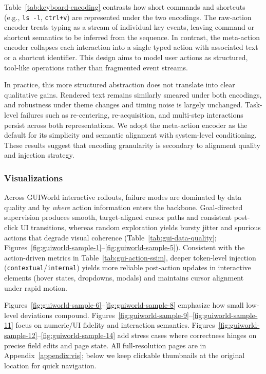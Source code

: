 Table~\ref{tab:keyboard-encoding} contrasts how short commands and shortcuts (e.g., \texttt{ls -l}, \texttt{ctrl+v}) are represented under the two encodings.
The raw-action encoder treats typing as a stream of individual key events, leaving command or shortcut semantics to be inferred from the sequence.
In contrast, the meta-action encoder collapses each interaction into a single typed action with associated text or a shortcut identifier.
This design aims to model user actions as structured, tool-like operations rather than fragmented event streams.

In practice, this more structured abstraction does not translate into clear qualitative gains.
Rendered text remains similarly smeared under both encodings, and robustness under theme changes and timing noise is largely unchanged.
Task-level failures such as re-centering, re-acquisition, and multi-step interactions persist across both representations.
We adopt the meta-action encoder as the default for its simplicity and semantic alignment with system-level conditioning.
These results suggest that encoding granularity is secondary to alignment quality and injection strategy.

\subsubsection{Visualizations}

Across GUIWorld interactive rollouts, failure modes are dominated by data quality and by \emph{where} action information enters the backbone.
Goal-directed supervision produces smooth, target-aligned cursor paths and consistent post-click UI transitions, whereas random exploration yields bursty jitter and spurious actions that degrade visual coherence (Table~\ref{tab:gui-data-quality}; Figures~\ref{fig:guiworld-sample-1}--\ref{fig:guiworld-sample-5}).
Consistent with the action-driven metrics in Table~\ref{tab:gui-action-ssim}, deeper token-level injection (\texttt{contextual}/\texttt{internal}) yields more reliable post-action updates in interactive elements (hover states, dropdowns, modals) and maintains cursor alignment under rapid motion.

Figures~\ref{fig:guiworld-sample-6}--\ref{fig:guiworld-sample-8} emphasize how small low-level deviations compound.
Figures~\ref{fig:guiworld-sample-9}--\ref{fig:guiworld-sample-11} focus on numeric/UI fidelity and interaction semantics.
Figures~\ref{fig:guiworld-sample-12}--\ref{fig:guiworld-sample-14} add stress cases where correctness hinges on precise field edits and page state.
All full-resolution pages are in Appendix~\ref{appendix:vis}; below we keep clickable thumbnails at the original location for quick navigation.

